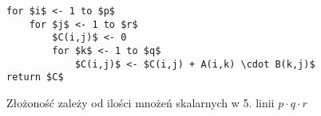 \begin{lstlisting}[caption={MatrixMultiply(A,B) - algorytm mnożenia macierzy A($p \times q)$ i $B(q \times r)$ } ]
for $i$ <- 1 to $p$
	for $j$ <- 1 to $r$
		$C(i,j)$ <- 0
		for $k$ <- 1 to $q$
			$C(i,j)$ <- $C(i,j) + A(i,k) \cdot B(k,j)$
return $C$
\end{lstlisting}

Złożoność zależy od ilości mnożeń skalarnych w 5. linii $p \cdot q \cdot r$



